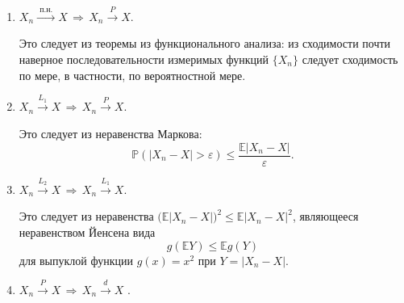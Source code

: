 \begin{solution}
\begin{enumerate}
\item $X_n\xrightarrow{\text{ п.н. }}X \,\Rightarrow\, X_n\xrightarrow{P}X$. 

Это следует из теоремы из функционального анализа: из сходимости почти наверное последовательности измеримых 
функций $\{ X_n\}$ следует сходимость по мере, в частности, по вероятностной мере. 

\item $X_n\xrightarrow{L_1}X \, \Rightarrow\, X_n\xrightarrow{P}X$. 

Это следует из неравенства Маркова: 
$$
{\mathbb P}(|X_n-X|>\varepsilon)\leqslant \frac{{\mathbb E}|X_n-X|}{\varepsilon} . 
$$

\item $X_n\xrightarrow{L_2} X \,\Rightarrow\, X_n\xrightarrow{L_1}X$. 

Это следует из неравенства $\bigl( {\mathbb E}|X_n-X|\bigr)^2 \leqslant {\mathbb E}|X_n-X|^2$, являющееся неравенством Йенсена вида 
$$
g({\mathbb E}Y)\leqslant {\mathbb E}g(Y) 
$$
для выпуклой функции $g(x)=x^2$ при $Y=|X_n-X|$. 

\item $X_n\xrightarrow{P}X \, \Rightarrow\, X_n\xrightarrow{d}X$ . 


\end{enumerate}
\end{solution}
